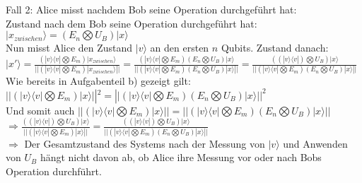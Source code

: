 \documentclass[a4paper]{scrartcl}
\begin{document}
\begin{enumerate}[a)]
\noindent Fall 2: Alice misst nachdem Bob seine Operation durchgeführt hat:\\
Zustand nach dem Bob seine Operation durchgeführt hat:\\
$|x_{zwischen}\rangle= (E_n\bigotimes U_B)|x\rangle$\\
Nun misst Alice den Zustand $|v\rangle$ an den ersten $n$ Qubits. Zustand danach:\\
$|x'\rangle = \frac{(|v\rangle\langle v|\bigotimes E_m)|x_{zwischen}\rangle}{||(|v\rangle\langle v|\bigotimes E_m)|x_{zwischen}\rangle ||}= \frac{(|v\rangle\langle v|\bigotimes E_m)(E_n\bigotimes U_B)|x\rangle}{ ||(|v\rangle\langle v|\bigotimes E_m)(E_n\bigotimes U_B)|x\rangle ||}= \frac{((|v\rangle\langle v|)\bigotimes U_B)|x\rangle}{||(|v\rangle\langle v|\bigotimes E_m)(E_n\bigotimes U_B)|x\rangle ||}$\\
Wie bereits in Aufgabenteil b) gezeigt gilt: $||(|v\rangle\langle v|\bigotimes E_m)|x\rangle||^2= ||(|v\rangle\langle v|\bigotimes E_m)(E_n\bigotimes U_B)|x\rangle ||^2$\\
 Und somit auch $||(|v\rangle\langle v|\bigotimes E_m)|x\rangle||=||(|v\rangle\langle v|\bigotimes E_m)(E_n\bigotimes U_B)|x\rangle ||$\\
 $\Rightarrow \frac{((|v\rangle\langle v|)\bigotimes U_B)|x\rangle}{||(|v\rangle\langle v|\bigotimes E_m)|x\rangle||}= \frac{((|v\rangle\langle v|)\bigotimes U_B)|x\rangle}{||(|v\rangle\langle v|\bigotimes E_m)(E_n\bigotimes U_B)|x\rangle ||}$\\
 $\Rightarrow$ Der Gesamtzustand des Systems nach der Messung von $|v\rangle$ und Anwenden von $U_B$ hängt nicht davon ab, ob Alice ihre Messung vor oder nach Bobs Operation durchführt.
\end{enumerate}
\end{document}
